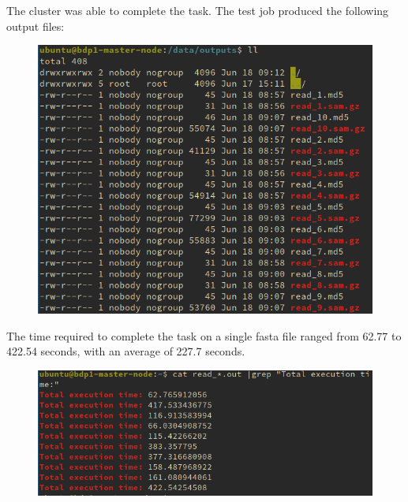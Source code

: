 \documentclass{article}
\begin{document}
The cluster was able to complete the task.
The test job produced the following output files:

\begin{figure}[!h]
    \center%
    \includegraphics[width=\textwidth]{./images/condor_test_out.png}
\end{figure}
\FloatBarrier%

The time required to complete the task on a single fasta file ranged from 62.77 to 422.54 seconds, with an average of 227.7 seconds.

\begin{figure}[!h]
    \center%
    \includegraphics[width=\textwidth]{./images/time_condor.png}
\end{figure}
\FloatBarrier%
\end{document}
